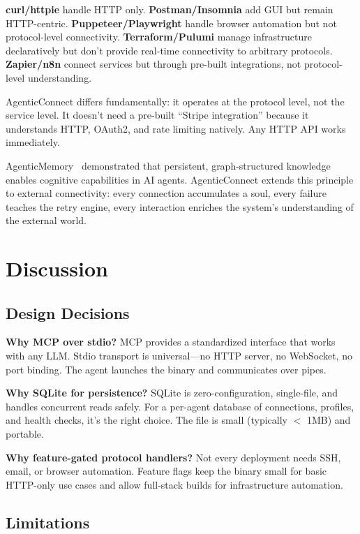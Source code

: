 \documentclass[10pt,twocolumn]{article}
\begin{document}
\textbf{curl/httpie} handle HTTP only. \textbf{Postman/Insomnia} add GUI but remain HTTP-centric. \textbf{Puppeteer/Playwright} handle browser automation but not protocol-level connectivity. \textbf{Terraform/Pulumi} manage infrastructure declaratively but don't provide real-time connectivity to arbitrary protocols. \textbf{Zapier/n8n} connect services but through pre-built integrations, not protocol-level understanding.

AgenticConnect differs fundamentally: it operates at the protocol level, not the service level. It doesn't need a pre-built ``Stripe integration'' because it understands HTTP, OAuth2, and rate limiting natively. Any HTTP API works immediately.

AgenticMemory~\cite{amem} demonstrated that persistent, graph-structured knowledge enables cognitive capabilities in AI agents. AgenticConnect extends this principle to external connectivity: every connection accumulates a soul, every failure teaches the retry engine, every interaction enriches the system's understanding of the external world.

\section{Discussion}

\subsection{Design Decisions}

\textbf{Why MCP over stdio?} MCP provides a standardized interface that works with any LLM. Stdio transport is universal—no HTTP server, no WebSocket, no port binding. The agent launches the binary and communicates over pipes.

\textbf{Why SQLite for persistence?} SQLite is zero-configuration, single-file, and handles concurrent reads safely. For a per-agent database of connections, profiles, and health checks, it's the right choice. The file is small (typically $<$ 1MB) and portable.

\textbf{Why feature-gated protocol handlers?} Not every deployment needs SSH, email, or browser automation. Feature flags keep the binary small for basic HTTP-only use cases and allow full-stack builds for infrastructure automation.

\subsection{Limitations}
\end{document}
